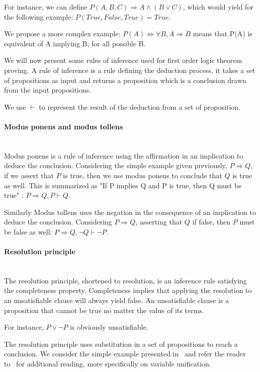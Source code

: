 For instance, we can define $P(A,B,C) \Rightarrow A \wedge (B \vee C)$, which would yield for the following example: $P(True,False,True)=True$.

We propose a more complex example: $P(A) \Leftrightarrow \forall B, A \Rightarrow B$ means that P(A) is equivalent of A implying B, for all possible B.

We will now present some rules of inference used for first order logic theorem proving.
A rule of inference is a rule defining the deduction process, it takes a set of propositions as input and returns a proposition which is a conclusion drawn from the input propositions.

We use $\vdash$ to represent the result of the deduction from a set of proposition.

\paragraph{Modus ponens and modus tollens}\textbf{\\}
Modus ponens is a rule of inference using the affirmation in an implication to deduce the conclusion.
Considering the simple example given previously, $P \Rightarrow Q$, if we assert that $P$ is true, then we use modus ponens to conclude that $Q$ is true as well. This is summarized as "If P implies Q and P is true, then Q must be true" : $P \Rightarrow Q, P \vdash Q$.

Similarly Modus tollens uses the negation in the consequence of an implication to deduce the conclusion.
Considering $P \Rightarrow Q$, asserting that $Q$ if false, then $P$ must be false as well: $P \Rightarrow Q, \neg Q \vdash \neg P$.

\paragraph{Resolution principle}\textbf{\\}
The resolution principle, shortened to resolution, is an inference rule satisfying the completeness property. Completeness implies that applying the resolution to an unsatisfiable clause will always yield false. An unsatisfiable clause is a proposition that cannot be true no matter the value of its terms.

For instance, $P \vee \neg P$ is obviously unsatisfiable.

The resolution principle uses substitution in a set of propositions to reach a conclusion.
We consider the simple example presented in~\cite{snark-Stickel2000} and refer the reader to~\cite{symbolic-proof} for additional reading, more specifically on variable unification.


